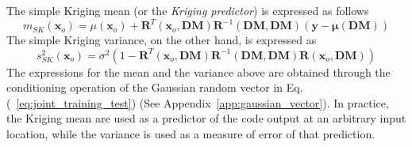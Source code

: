 The simple Kriging mean (or the \emph{Kriging predictor}) is expressed as follows
\begin{equation}
	m_{SK} (\bm{x}_o) = \mu (\bm{x}_o) + \mathbf{R}^T(\bm{x}_o, \mathbf{DM}) \mathbf{R}^{-1}(\mathbf{DM}, \mathbf{DM}) (\mathbf{y} - \boldsymbol{\mu}(\mathbf{DM}))
\label{eq:mean_sk}
\end{equation}
The simple Kriging variance, on the other hand, is expressed as
\begin{equation}
	s^2_{SK} (\bm{x}_o) = \sigma^2 (1 - \mathbf{R}^T(\bm{x}_o, \mathbf{DM}) \mathbf{R}^{-1}(\mathbf{DM}, \mathbf{DM}) \mathbf{R}(\bm{x}_o, \mathbf{DM}))
\label{eq:variance_sk}
\end{equation}
The expressions for the mean and the variance above are obtained through the conditioning operation of the Gaussian random vector in Eq.(~\ref{eq:joint_training_test}) (See Appendix~\ref{app:gaussian_vector}). 
In practice, the Kriging mean are used as a predictor of the code output at an arbitrary input location, 
while the variance is used as a measure of error of that prediction.

